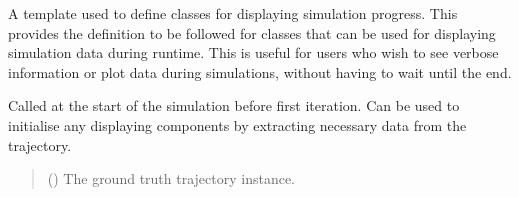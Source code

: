 \documentclass[letterpaper,10pt,english]{sphinxmanual}
\begin{document}
\begin{fulllineitems}
\label{\detokenize{modules/simulation/display:qnav.simulation.display.Display}}
\pysigstartsignatures
{}
\pysigstopsignatures
\sphinxAtStartPar
A template used to define classes for displaying simulation progress.
This provides the definition to be followed for classes that can be
used for displaying simulation data during runtime. This is useful
for users who wish to see verbose information or plot data during
simulations, without having to wait until the end.

\begin{fulllineitems}
\label{\detokenize{modules/simulation/display:qnav.simulation.display.Display.on_start}}
\pysigstartsignatures
{}
\pysigstopsignatures
\sphinxAtStartPar
Called at the start of the simulation before first iteration.
Can be used to initialise any displaying components by extracting
necessary data from the trajectory.
\begin{quote}\begin{description}
\sphinxAtStartPar
{} ({\hyperref[\detokenize{modules/waypoints/trajectory:qnav.waypoints.trajectory.Trajectory}]{}}) \textendash{} The ground truth trajectory instance.

\end{description}\end{quote}

\end{fulllineitems}



\end{fulllineitems}
\end{document}
